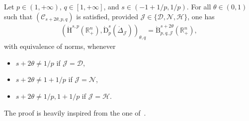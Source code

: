 \documentclass[AHL,Unicode,longabstracts,published]{cedram}
\newcommand{\bbR}{\mathbb{R}}
\newcommand{\rmH}{\mathrm{H}}%
\newcommand{\rmB}{\mathrm{B}}
\newcommand{\rmD}{\mathrm{D}}
\newcommand{\clH}{\mathcal{H}}
\newcommand{\clC}{\mathcal{C}}
\newcommand{\clN}{\mathcal{N}}
\newcommand{\clJ}{\mathcal{J}}
\newcommand{\clD}{\mathcal{D}}
\begin{document}
\begin{prop}\label{prop:InterpHomDomainLaplacians}
Let $p\in(1,+\infty)$, $q\in[1,+\infty]$, and $s\in(-1+1/p,1/p)$. For all $\theta\in(0,1)$ such that $(\clC_{s+2\theta,p,q})$ is satisfied, provided $\clJ\in\{\clD,\clN,\clH\}$, one has
\begin{align*}
\left(\dot{\rmH}^{s,p}\left(\bbR^n_+\right),\dot{\rmD}^{s}_{p}\left(\mathring{\Delta}_\clJ\right)\right)_{\theta,q} = \dot{\rmB}^{s+2\theta}_{p,q,\clJ}\left(\bbR^n_+\right),
\end{align*}
with equivalence of norms, whenever
\begin{itemize}
\item $s+2\theta\neq 1/p$ if $\clJ=\clD$,
\item $s+2\theta\neq 1+1/p$ if $\clJ=\clN$,
\item $s+2\theta\neq 1/p,1+1/p$ if $\clJ=\clH$.
\end{itemize}
\end{prop}

The proof is heavily inspired from the one of~\cite[Proposition~4.12]{DanchinHieberMuchaTolk2020}.
\end{document}
